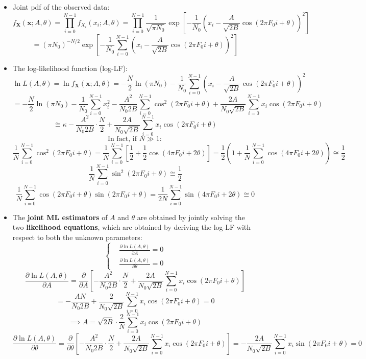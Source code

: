 \begin{itemize}
\[
E\left\{ \|\mathbf{W}\|^2 \right\}
= E\left\{ \sum_{i=0}^{N-1} W_i^2 \right\}
= \sum_{i=0}^{N-1} E\left\{ W_i^2 \right\}
= N \sigma_W^2 = N \cdot \frac{N_0}{2}
\]

    \item Joint pdf of the observed data:
\[
f_{\mathbf{X}}(\mathbf{x};A,\theta)
= \prod_{i=0}^{N-1} f_{X_i}(x_i;A,\theta)
= \prod_{i=0}^{N-1} \frac{1}{\sqrt{\pi N_0}}
\exp\left[-\frac{1}{N_0} \left(x_i - \frac{A}{\sqrt{2B}} \cos(2\pi F_0 i + \theta)\right)^2 \right]
\]
\[
= (\pi N_0)^{-N/2}
\exp\left[-\frac{1}{N_0} \sum_{i=0}^{N-1} \left(x_i - \frac{A}{\sqrt{2B}} \cos(2\pi F_0 i + \theta)\right)^2 \right]
\]
    \item The log-likelihood function (log-LF):
    \[
\ln L(A, \theta)
= \ln f_{\mathbf{X}}(\mathbf{x};A,\theta)
= -\frac{N}{2} \ln(\pi N_0)
- \frac{1}{N_0} \sum_{i=0}^{N-1}
\left( x_i - \frac{A}{\sqrt{2B}} \cos(2\pi F_0 i + \theta) \right)^2
\]
\[
= -\frac{N}{2} \ln(\pi N_0)
- \frac{1}{N_0} \sum_{i=0}^{N-1} x_i^2
- \frac{A^2}{N_0 2B} \sum_{i=0}^{N-1} \cos^2(2\pi F_0 i + \theta)
+ \frac{2A}{N_0 \sqrt{2B}} \sum_{i=0}^{N-1} x_i \cos(2\pi F_0 i + \theta)
\]
\[
\cong \kappa
- \frac{A^2}{N_0 2B} \cdot \frac{N}{2}
+ \frac{2A}{N_0 \sqrt{2B}} \sum_{i=0}^{N-1} x_i \cos(2\pi F_0 i + \theta)
\]
\vspace{0.5em}
\[
\text{In fact, if } N \gg 1:
\]
\[
\frac{1}{N} \sum_{i=0}^{N-1} \cos^2 (2\pi F_0 i + \theta)
= \frac{1}{N} \sum_{i=0}^{N-1} \left[ \frac{1}{2} + \frac{1}{2} \cos(4\pi F_0 i + 2\theta) \right]
= \frac{1}{2} \left( 1 + \frac{1}{N} \sum_{i=0}^{N-1} \cos(4\pi F_0 i + 2\theta) \right)
\cong \frac{1}{2}
\]
\[
\frac{1}{N} \sum_{i=0}^{N-1} \sin^2 (2\pi F_0 i + \theta) \cong \frac{1}{2}
\]
\[
\frac{1}{N} \sum_{i=0}^{N-1} \cos(2\pi F_0 i + \theta) \sin(2\pi F_0 i + \theta)
= \frac{1}{2N} \sum_{i=0}^{N-1} \sin(4\pi F_0 i + 2\theta) \cong 0
\]

    \item The \textbf{joint ML estimators} of \(A\) and \(\theta\) are obtained by jointly solving the two \textbf{likelihood equations}, which are obtained by deriving the log-LF with respect to both the unknown parameters:
    \[
\left\{
\begin{aligned}
&\frac{\partial \ln L(A,\theta)}{\partial A} = 0 \\
&\frac{\partial \ln L(A,\theta)}{\partial \theta} = 0
\end{aligned}
\right.
\]
\[
\frac{\partial \ln L(A,\theta)}{\partial A}
= \frac{\partial}{\partial A} \left[
-\frac{A^2}{N_0 2B} \cdot \frac{N}{2}
+ \frac{2A}{N_0 \sqrt{2B}} \sum_{i=0}^{N-1} x_i \cos(2\pi F_0 i + \theta)
\right]
\]
\[
= -\frac{AN}{N_0 2B}
+ \frac{2}{N_0 \sqrt{2B}}
\sum_{i=0}^{N-1} x_i \cos(2\pi F_0 i + \theta)
= 0
\]
\[
\implies
A = \sqrt{2B} \cdot \frac{2}{N} \sum_{i=0}^{N-1} x_i \cos(2\pi F_0 i + \theta)
\]
\[
\frac{\partial \ln L(A,\theta)}{\partial \theta}
= \frac{\partial}{\partial \theta}
\left[
    -\frac{A^2}{N_0 2B} \cdot \frac{N}{2}
    + \frac{2A}{N_0 \sqrt{2B}}
    \sum_{i=0}^{N-1}
    x_i \cos(2\pi F_0 i + \theta)
\right]
= -\frac{2A}{N_0 \sqrt{2B}}
\sum_{i=0}^{N-1} x_i \sin(2\pi F_0 i + \theta)
= 0
\]


\end{itemize}
